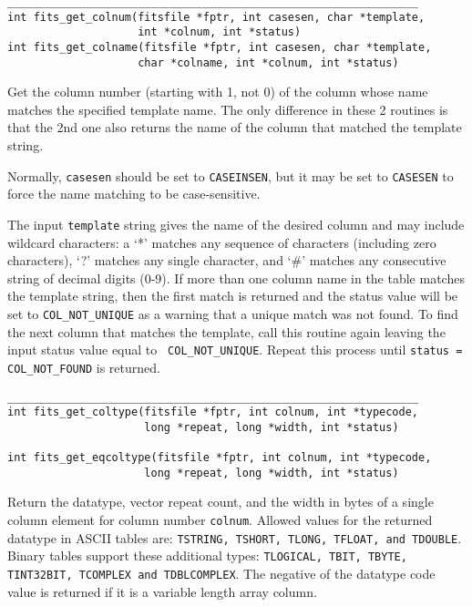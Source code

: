 \documentclass[11pt]{article}
\begin{document}
\begin{verbatim}
_______________________________________________________________
int fits_get_colnum(fitsfile *fptr, int casesen, char *template,
                    int *colnum, int *status)
int fits_get_colname(fitsfile *fptr, int casesen, char *template,
                    char *colname, int *colnum, int *status)
\end{verbatim}

Get the  column number (starting with 1, not 0) of the column whose
name matches the specified template name.  The only difference in
these 2 routines is that the 2nd one also returns the name of the
column that matched the template string.

Normally, {\tt casesen} should
be set to {\tt CASEINSEN}, but it may be set to {\tt CASESEN} to force
the name matching to be case-sensitive.

The input {\tt template} string gives the name of the desired column and
may include wildcard characters:  a `*' matches any sequence of
characters (including zero characters), `?' matches any single
character, and `\#' matches any consecutive string of decimal digits
(0-9).  If more than one column name in the table matches the template
string, then the first match is returned and the status value will be
set to {\tt COL\_NOT\_UNIQUE}  as a warning that a unique match was not
found.  To find the next column that matches the template, call this
routine again leaving the input status value equal to {\tt
COL\_NOT\_UNIQUE}.  Repeat this process until {\tt status =
COL\_NOT\_FOUND}  is returned.

\begin{verbatim}
_______________________________________________________________
int fits_get_coltype(fitsfile *fptr, int colnum, int *typecode,
                     long *repeat, long *width, int *status)

int fits_get_eqcoltype(fitsfile *fptr, int colnum, int *typecode,
                     long *repeat, long *width, int *status)
\end{verbatim}

Return the datatype, vector repeat count, and the width in bytes of a
single column element for column number {\tt colnum}.  Allowed values
for the returned datatype in ASCII tables are:  {\tt TSTRING, TSHORT,
TLONG, TFLOAT, and TDOUBLE}.  Binary tables support these additional
types: {\tt TLOGICAL, TBIT, TBYTE, TINT32BIT, TCOMPLEX and TDBLCOMPLEX}.  The
negative of the datatype code value is returned if it is a variable
length array column.
\end{document}
